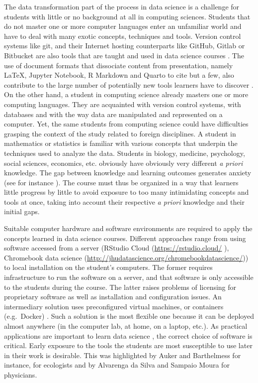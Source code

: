 \documentclass{aims}
\theoremstyle{definition}
\begin{document}
The data transformation part of the process in data science is a
challenge for students with little or no background at all in computing
sciences. Students that do not master one or more computer languages
enter an unfamiliar world and have to deal with many exotic concepts,
techniques and tools. Version control systems like git, and their
Internet hosting counterparts like GitHub, Gitlab or Bitbucket are also
tools that are taught and used in data science courses
\cite{Fiksel2019, Hsing2019}. The use of document formats that
dissociate content from presentation, namely LaTeX, Jupyter Notebook, R
Markdown and Quarto to cite but a few, also contribute to the large
number of potentially new tools learners have to discover
\cite{Baumer2014}. On the other hand, a student in computing science
already masters one or more computing languages. They are acquainted
with version control systems, with databases and with the way data are
manipulated and represented on a computer. Yet, the same students from
computing science could have difficulties grasping the context of the
study related to foreign disciplines. A student in mathematics or
statistics is familiar with various concepts that underpin the
techniques used to analyze the data. Students in biology, medicine,
psychology, social sciences, economics, etc. obviously have obviously
very different \emph{a priori} knowledge. The gap between knowledge and
learning outcomes generates anxiety (see for instance
\cite{Onwuegbuzie2003}). The course must thus be organized in a way that
learners little progress by little to avoid exposure to too many
intimidating concepts and tools at once, taking into account their
respective \emph{a priori} knowledge and their initial gaps.

Suitable computer hardware and software environments are required to
apply the concepts learned in data science courses. Different approaches
range from using software accessed from a server \cite{Theobold2021}
(RStudio Cloud (\url{https://rstudio.cloud/} \cite{Rstudio2015}),
Chromebook data science
(\url{http://jhudatascience.org/chromebookdatascience/})) to local
installation on the student's computers. The former requires
infrastructure to run the software on a server, and that software is
only accessible to the students during the course. The latter raises
problems of licensing for proprietary software as well as installation
and configuration issues. An intermediary solution uses preconfigured
virtual machines, or containers (e.g.~Docker)
\cite{Cetinkaya-Rundel2018, Boettiger2015}. Such a solution is the most
flexible one because it can be deployed almost anywhere (in the computer
lab, at home, on a laptop, etc.). As practical applications are
important to learn data science \cite{Larwin2011}, the correct choice of
software is critical. Early exposure to the tools the students are most
susceptible to use later in their work is desirable. This was
highlighted by Auker and Barthelmess \cite{Auker2020} for instance, for
ecologists and by Alvarenga da Silva and Sampaio Moura
\cite{Alvarenga2020} for physicians.
\end{document}
